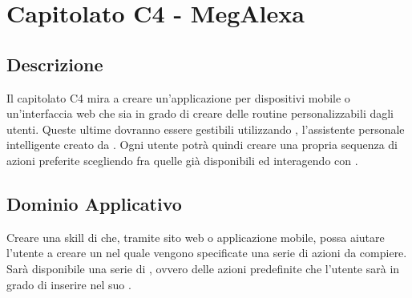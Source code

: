 \clearpage
\section{Capitolato C4 - MegAlexa}
\label{sec:c4}
\subsection{Descrizione}
Il capitolato C4 mira a creare un'applicazione per dispositivi mobile o un'interfaccia web che sia in grado di creare delle routine personalizzabili dagli utenti.
Queste ultime dovranno essere gestibili utilizzando , l'assistente personale intelligente creato da . Ogni utente potrà quindi creare una propria sequenza di azioni preferite scegliendo fra quelle già disponibili ed interagendo con .

\subsection{Dominio Applicativo}
Creare una skill di  che, tramite sito web o applicazione mobile, possa aiutare l'utente a creare un  nel quale vengono specificate una serie di azioni da compiere. 
Sarà disponibile una serie di , ovvero delle azioni predefinite che l'utente sarà in grado di inserire nel suo .

